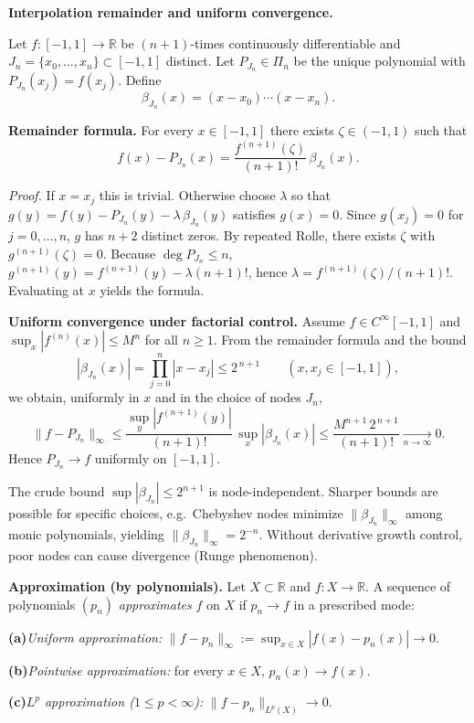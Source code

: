 \begin{problem}[CP-II-0340]
\label{prob:cp-ii-0340}
\textbf{Interpolation remainder and uniform convergence.}

\hspace*{1.5em}Let $f:[-1,1]\to\mathbb{R}$ be $(n+1)$-times continuously differentiable and
$J_n=\{x_0,\dots,x_n\}\subset[-1,1]$ distinct.
Let $P_{J_n}\in\Pi_n$ be the unique polynomial with $P_{J_n}(x_j)=f(x_j)$.
Define
\[
\beta_{J_n}(x)=(x-x_0)\cdots(x-x_n).
\]

\bigskip

\noindent\textbf{Remainder formula.}
For every $x\in[-1,1]$ there exists $\zeta\in(-1,1)$ such that
\[
f(x)-P_{J_n}(x)=\frac{f^{(n+1)}(\zeta)}{(n+1)!}\,\beta_{J_n}(x).
\]

\emph{Proof.}
If $x=x_j$ this is trivial. Otherwise choose $\lambda$ so that
$g(y)=f(y)-P_{J_n}(y)-\lambda\,\beta_{J_n}(y)$ satisfies $g(x)=0$.
Since $g(x_j)=0$ for $j=0,\dots,n$, $g$ has $n+2$ distinct zeros.
By repeated Rolle, there exists $\zeta$ with
$g^{(n+1)}(\zeta)=0$. Because $\deg P_{J_n}\le n$,
$g^{(n+1)}(y)=f^{(n+1)}(y)-\lambda (n+1)!$, hence
$\lambda=f^{(n+1)}(\zeta)/(n+1)!$. Evaluating at $x$ yields the formula.

\bigskip

\noindent\textbf{Uniform convergence under factorial control.}
Assume $f\in C^\infty[-1,1]$ and $\sup_{x}|f^{(n)}(x)|\le M^n$ for all $n\ge1$.
From the remainder formula and the bound
\[
|\beta_{J_n}(x)|=\prod_{j=0}^{n}|x-x_j|\le 2^{\,n+1}\qquad(x,x_j\in[-1,1]),
\]
we obtain, uniformly in $x$ and in the choice of nodes $J_n$,
\[
\|f-P_{J_n}\|_{\infty}
\le \frac{\sup_{y}|f^{(n+1)}(y)|}{(n+1)!}\,\sup_{x}|\beta_{J_n}(x)|
\le \frac{M^{n+1}\,2^{\,n+1}}{(n+1)!}\xrightarrow[n\to\infty]{}0.
\]
Hence $P_{J_n}\to f$ uniformly on $[-1,1]$.

\bigskip

The crude bound $\sup|\beta_{J_n}|\le 2^{n+1}$ is node-independent.
Sharper bounds are possible for specific choices, e.g.\ Chebyshev nodes minimize $\|\beta_{J_n}\|_\infty$
among monic polynomials, yielding $\|\beta_{J_n}\|_\infty=2^{-n}$.
Without derivative growth control, poor nodes can cause divergence (Runge phenomenon).

\noindent\textbf{Approximation (by polynomials).}
Let $X\subset\mathbb{R}$ and $f:X\to\mathbb{R}$. A sequence of polynomials $(p_n)$
\emph{approximates} $f$ on $X$ if $p_n\to f$ in a prescribed mode:
 \setlength{\itemsep}{0.4em}
	\par\smallskip\noindent\textbf{(a)}\quad \emph{Uniform approximation:} $\|f-p_n\|_\infty:=\sup_{x\in X}|f(x)-p_n(x)|\to 0$.
	\par\smallskip\noindent\textbf{(b)}\quad \emph{Pointwise approximation:} for every $x\in X$, $p_n(x)\to f(x)$.
	\par\smallskip\noindent\textbf{(c)}\quad \emph{$L^p$ approximation ($1\le p<\infty$):} $\|f-p_n\|_{L^p(X)}\to 0$.


\end{problem}

